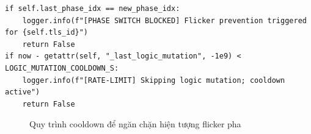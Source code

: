 \begin{lstlisting}[style=py,caption={Cơ chế cooldown và ngăn chặn flicker}]
if self.last_phase_idx == new_phase_idx:
    logger.info(f"[PHASE SWITCH BLOCKED] Flicker prevention triggered for {self.tls_id}")
    return False
if now - getattr(self, "_last_logic_mutation", -1e9) < LOGIC_MUTATION_COOLDOWN_S:
    logger.info(f"[RATE-LIMIT] Skipping logic mutation; cooldown active")
    return False
\end{lstlisting}

\begin{figure}[H]
    \centering
    \caption{Quy trình cooldown để ngăn chặn hiện tượng flicker pha}
\end{figure}
